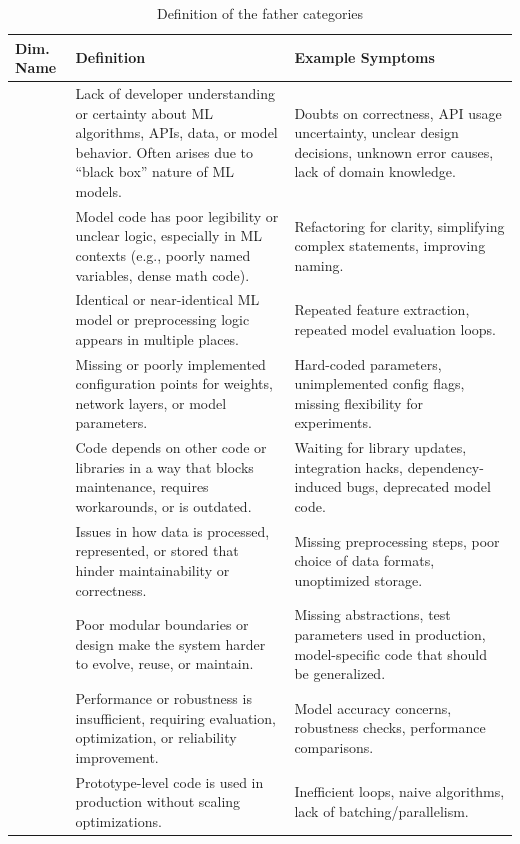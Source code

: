 \begin{table}[ht]
\centering
\small
\caption{Definition of the father categories}
\label{tab:Super_def}
\begin{tabularx}{\textwidth}{
    >{\centering\arraybackslash}p{0.8cm}
    >{\raggedright\arraybackslash}X 
    >{\raggedright\arraybackslash}X 
}
\hline
\textbf{Dim. Name} & \textbf{Definition} & \textbf{Example Symptoms} \\
\hline
\multirow{4}{*}{AWR} & Lack of developer understanding or certainty about ML algorithms, APIs, data, or model behavior. Often arises due to ``black box'' nature of ML models. & Doubts on correctness, API usage uncertainty, unclear design decisions, unknown error causes, lack of domain knowledge. \\
\hline
\multirow{3}{*}{RDB} & Model code has poor legibility or unclear logic, especially in ML contexts (e.g., poorly named variables, dense math code). & Refactoring for clarity, simplifying complex statements, improving naming. \\
\hline
\multirow{2}{*}{DCE} & Identical or near-identical ML model or preprocessing logic appears in multiple places. & Repeated feature extraction, repeated model evaluation loops. \\
\hline
\multirow{3}{*}{CFO} & Missing or poorly implemented configuration points for weights, network layers, or model parameters. & Hard-coded parameters, unimplemented config flags, missing flexibility for experiments. \\
\hline
\multirow{3}{*}{CDD} & Code depends on other code or libraries in a way that blocks maintenance, requires workarounds, or is outdated. & Waiting for library updates, integration hacks, dependency-induced bugs, deprecated model code. \\
\hline
\multirow{3}{*}{DTD} & Issues in how data is processed, represented, or stored that hinder maintainability or correctness. & Missing preprocessing steps, poor choice of data formats, unoptimized storage. \\
\hline
\multirow{3}{*}{MDL} & Poor modular boundaries or design make the system harder to evolve, reuse, or maintain. & Missing abstractions, test parameters used in production, model-specific code that should be generalized. \\
\hline
\multirow{3}{*}{PRF} & Performance or robustness is insufficient, requiring evaluation, optimization, or reliability improvement. & Model accuracy concerns, robustness checks, performance comparisons. \\
\hline
\multirow{2}{*}{SCL} & Prototype-level code is used in production without scaling optimizations. & Inefficient loops, naive algorithms, lack of batching/parallelism. \\
\hline
\end{tabularx}
\end{table}